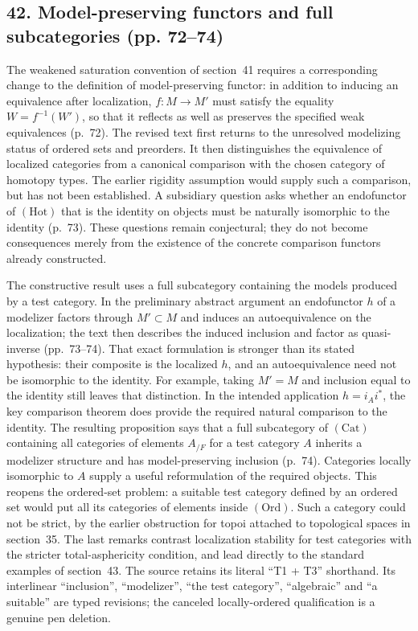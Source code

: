 \subsection*{42. Model-preserving functors and full subcategories (pp. 72--74)}
The weakened saturation convention of section~41 requires a corresponding change to the definition of model-preserving functor: in addition to inducing an equivalence after localization, $f:M\to M'$ must satisfy the equality $W=f^{-1}(W')$, so that it reflects as well as preserves the specified weak equivalences (p.~72). The revised text first returns to the unresolved modelizing status of ordered sets and preorders. It then distinguishes the equivalence of localized categories from a canonical comparison with the chosen category of homotopy types. The earlier rigidity assumption would supply such a comparison, but has not been established. A subsidiary question asks whether an endofunctor of $(\mathrm{Hot})$ that is the identity on objects must be naturally isomorphic to the identity (p.~73). These questions remain conjectural; they do not become consequences merely from the existence of the concrete comparison functors already constructed.

The constructive result uses a full subcategory containing the models produced by a test category. In the preliminary abstract argument an endofunctor $h$ of a modelizer factors through $M'\subset M$ and induces an autoequivalence on the localization; the text then describes the induced inclusion and factor as quasi-inverse (pp.~73--74). That exact formulation is stronger than its stated hypothesis: their composite is the localized $h$, and an autoequivalence need not be isomorphic to the identity. For example, taking $M'=M$ and inclusion equal to the identity still leaves that distinction. In the intended application $h=i_Ai^*$, the key comparison theorem does provide the required natural comparison to the identity. The resulting proposition says that a full subcategory of $(\mathrm{Cat})$ containing all categories of elements $A_{/F}$ for a test category $A$ inherits a modelizer structure and has model-preserving inclusion (p.~74). Categories locally isomorphic to $A$ supply a useful reformulation of the required objects. This reopens the ordered-set problem: a suitable test category defined by an ordered set would put all its categories of elements inside $(\mathrm{Ord})$. Such a category could not be strict, by the earlier obstruction for topoi attached to topological spaces in section~35. The last remarks contrast localization stability for test categories with the stricter total-asphericity condition, and lead directly to the standard examples of section~43. The source retains its literal ``T1 + T3'' shorthand. Its interlinear ``inclusion'', ``modelizer'', ``the test category'', ``algebraic'' and ``a suitable'' are typed revisions; the canceled locally-ordered qualification is a genuine pen deletion.

